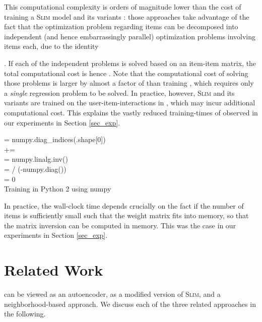 \documentclass[sigconf]{acmart}
\newcommand{\slim}{{\scshape Slim}}
\newcommand{\sae}{}
\begin{document}
This computational complexity is orders of magnitude lower than the cost of training a \slim{} model and its variants \cite{ning11,levy13,sedhain16}: those approaches take advantage of the fact that the optimization problem regarding  items can be decomposed into  independent (and hence embarrassingly parallel)  optimization problems involving   items each,  due to the identity

. If each of the   independent problems is solved based on an item-item matrix,
the total computational cost is hence  . Note that the  computational cost of solving those   problems is larger by almost a factor of  than training \sae{}, which requires only a  \emph{single} regression problem to be solved. In practice, however, \slim{}  and its variants are trained on the user-item-interactions in  , which may incur additional computational cost.
This explains the vastly reduced training-times of \sae{}   observed in our experiments in Section \ref{sec_exp}.


\begin{algorithm}[t]
\SetAlgoNoLine
{}
 = numpy.diag\_indices(.shape[0])  \\
 +=   \\
 = numpy.linalg.inv() \\
 =   / (-numpy.diag()) \\
 = 0  \\
\caption{Training in Python 2 using numpy}
\label{algo}
\end{algorithm}



In practice, the wall-clock time depends  crucially on the fact if the  number of items  is sufficiently small such that the weight matrix fits into memory, so that the matrix inversion can be computed in memory. This was the case in our experiments in Section \ref{sec_exp}. 



\section{Related Work}
\label{sec_related}

\sae{}  can be viewed as an autoencoder, as a modified version of \slim{}, and  a neighborhood-based approach. We discuss each of the three related approaches in the following.
\end{document}
